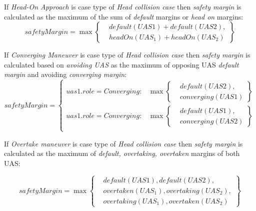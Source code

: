 If \emph{Head-On Approach} is case type of \emph{Head collision case} then \emph{safety margin} is calculated as the maximum of the sum of \emph{default} margins or \emph{head on} margins:
\begin{equation}
    safetyMargin = \max\left\{\begin{aligned}&default(UAS1)+default(UAS2),\\ &headOn(UAS_1)+headOn(UAS_2)\end{aligned}\right\}
\end{equation}

If \emph{Converging Maneuver} is case type of \emph{Head collision case} then \emph{safety margin} is calculated based on \emph{avoiding UAS} as the maximum of opposing UAS \emph{default margin} and avoiding \emph{converging margin}:
\begin{equation}
    safetyMargin = 
    \begin{cases}
        uas1.role = Converging :& \max\left\{\begin{aligned}&default(UAS2),\\&converging(UAS1)\end{aligned}\right\} \\
        uas1.role = Converging :&   \max\left\{\begin{aligned}&default(UAS1),\\&converging(UAS2)\end{aligned}\right\} \\
    \end{cases}
\end{equation}

If \emph{Overtake maneuver} is case type of \emph{Head collision case} then \emph{safety margin} is calculated as the maximum of \emph{default, overtaking, overtaken} margins of both UAS:

\begin{equation}
    safetyMargin = \max\left\{\begin{aligned}&default(UAS1),default(UAS2),\\ &overtaken(UAS_1),overtaking(UAS_2),\\&overtaking(UAS_1),overtaken(UAS_2)\end{aligned}\right\}
\end{equation}

